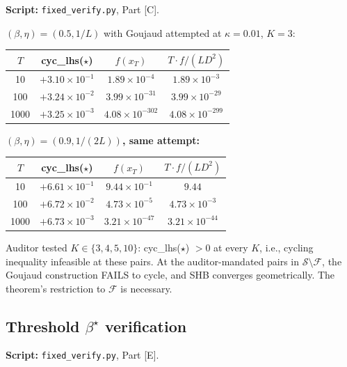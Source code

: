 \documentclass[11pt]{article}
\theoremstyle{definition}
\theoremstyle{remark}
\begin{document}
\textbf{Script:} \texttt{fixed\_verify.py}, Part [C].

\textbf{$(\beta,\eta) = (0.5, 1/L)$} with Goujaud attempted at $\kappa = 0.01$, $K = 3$:

\begin{center}
\small
\begin{tabular}{cccc}
\toprule
$T$ & cyc\_lhs($\star$) & $f(x_T)$ & $T \cdot f/(LD^2)$ \\
\midrule
10   & $+3.10 \times 10^{-1}$ & $1.89 \times 10^{-4}$  & $1.89 \times 10^{-3}$ \\
100  & $+3.24 \times 10^{-2}$ & $3.99 \times 10^{-31}$ & $3.99 \times 10^{-29}$ \\
1000 & $+3.25 \times 10^{-3}$ & $4.08 \times 10^{-302}$ & $4.08 \times 10^{-299}$ \\
\bottomrule
\end{tabular}
\end{center}

\textbf{$(\beta,\eta) = (0.9, 1/(2L))$, same attempt:}

\begin{center}
\small
\begin{tabular}{cccc}
\toprule
$T$ & cyc\_lhs($\star$) & $f(x_T)$ & $T \cdot f/(LD^2)$ \\
\midrule
10   & $+6.61 \times 10^{-1}$ & $9.44 \times 10^{-1}$  & $9.44$ \\
100  & $+6.72 \times 10^{-2}$ & $4.73 \times 10^{-5}$  & $4.73 \times 10^{-3}$ \\
1000 & $+6.73 \times 10^{-3}$ & $3.21 \times 10^{-47}$ & $3.21 \times 10^{-44}$ \\
\bottomrule
\end{tabular}
\end{center}

Auditor tested $K \in \{3, 4, 5, 10\}$: cyc\_lhs($\star$) $> 0$ at every $K$, i.e., cycling inequality infeasible at these pairs. At the auditor-mandated pairs in $\mathcal{S}\setminus\mathcal{F}$, the Goujaud construction FAILS to cycle, and SHB converges geometrically. The theorem's restriction to $\mathcal{F}$ is necessary.

\subsection{Threshold \texorpdfstring{$\beta^\star$}{beta-star} verification}
\label{sec:threshold}

\textbf{Script:} \texttt{fixed\_verify.py}, Part [E].
\end{document}
